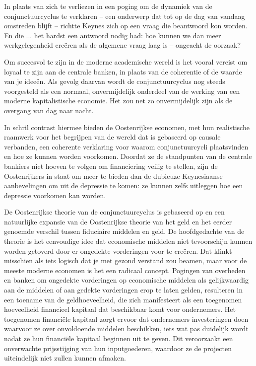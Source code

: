 \begin{blockquotebox}
    In plaats van zich te verliezen in een poging om de dynamiek van de conjunctuurcyclus te verklaren -- een onderwerp dat tot op de dag van vandaag omstreden blijft -- richtte Keynes zich op een vraag die beantwoord kon worden. En die ... het hardst een antwoord nodig had: hoe kunnen we dan meer werkgelegenheid creëren als de algemene vraag laag is -- ongeacht de oorzaak?\footnotemark
\end{blockquotebox}
\autocite{174}

Om succesvol te zijn in de moderne academische wereld is het vooral vereist om loyaal te zijn aan de centrale banken, in plaats van de coherentie of de waarde van je ideeën. Als gevolg daarvan wordt de conjunctuurcyclus nog steeds voorgesteld als een normaal, onvermijdelijk onderdeel van de werking van een moderne kapitalistische economie. Het zou net zo onvermijdelijk zijn als de overgang van dag naar nacht.

In schril contrast hiermee bieden de Oostenrijkse economen, met hun realistische raamwerk voor het begrijpen van de wereld dat is gebaseerd op causale verbanden, een coherente verklaring voor waarom conjunctuurcycli plaatsvinden en hoe ze kunnen worden voorkomen. Doordat ze de standpunten van de centrale bankiers niet hoeven te volgen om financiering veilig te stellen, zijn de Oostenrijkers in staat om meer te bieden dan de dubieuze Keynesiaanse aanbevelingen om uit de depressie te komen: ze kunnen zelfs uitleggen hoe een depressie voorkomen kan worden.

De Oostenrijkse theorie van de conjunctuurcyclus is gebaseerd op en een natuurlijke expansie van de Oostenrijkse theorie van het geld en het eerder genoemde verschil tussen fiduciaire middelen en geld. De hoofdgedachte van de theorie is het eenvoudige idee dat economische middelen niet tevoorschijn kunnen worden getoverd door er ongedekte vorderingen voor te creëren. Dat klinkt misschien als iets logisch dat je met gezond verstand zou beamen, maar voor de meeste moderne economen is het een radicaal concept. Pogingen van overheden en banken om ongedekte vorderingen op economische middelen als gelijkwaardig aan de middelen of aan gedekte vorderingen erop te laten gelden, resulteren in een toename van de geldhoeveelheid, die zich manifesteert als een toegenomen hoeveelheid financieel kapitaal dat beschikbaar komt voor ondernemers. Het toegenomen financiële kapitaal zorgt ervoor dat ondernemers investeringen doen waarvoor ze over onvoldoende middelen beschikken, iets wat pas duidelijk wordt nadat ze hun financiële kapitaal beginnen uit te geven. Dit veroorzaakt een onverwachte prijsstijging van hun inputgoederen, waardoor ze de projecten uiteindelijk niet zullen kunnen afmaken.

